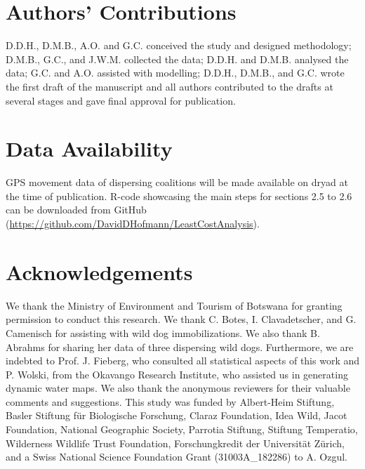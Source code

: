 \documentclass[abstract=on,10pt,a4paper,bibliography=totocnumbered]{article}
\begin{document}
\section{Authors' Contributions}
D.D.H., D.M.B., A.O. and G.C. conceived the study and designed methodology;
D.M.B., G.C., and J.W.M. collected the data; D.D.H. and D.M.B. analysed the
data; G.C. and A.O. assisted with modelling; D.D.H., D.M.B., and G.C. wrote the
first draft of the manuscript and all authors contributed to the drafts at
several stages and gave final approval for publication.

\section{Data Availability}
GPS movement data of dispersing coalitions will be made available on dryad at
the time of publication. R-code showcasing the main steps for sections 2.5 to
2.6 can be downloaded from GitHub
(\url{https://github.com/DavidDHofmann/LeastCostAnalysis}).

\section{Acknowledgements}
We thank the Ministry of Environment and Tourism of Botswana for granting
permission to conduct this research. We thank C. Botes, I. Clavadetscher, and G.
Camenisch for assisting with wild dog immobilizations. We also thank B. Abrahms
for sharing her data of three dispersing wild dogs. Furthermore, we are indebted
to Prof. J. Fieberg, who consulted all statistical aspects of this work and P.
Wolski, from the Okavango Research Institute, who assisted us in generating
dynamic water maps. We also thank the anonymous reviewers for their valuable
comments and suggestions. This study was funded by Albert-Heim Stiftung, Basler
Stiftung für Biologische Forschung, Claraz Foundation, Idea Wild, Jacot
Foundation, National Geographic Society, Parrotia Stiftung, Stiftung Temperatio,
Wilderness Wildlife Trust Foundation, Forschungkredit der Universität Zürich,
and a Swiss National Science Foundation Grant (31003A\_182286) to A. Ozgul.

\newpage
\begingroup
\singlespacing

\endgroup
\end{document}
